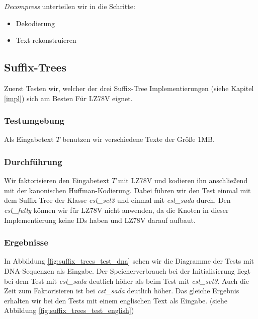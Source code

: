 \documentclass[a4paper,11pt]{scrartcl}%
\theoremstyle{change}
\theoremstyle{nonumberplain}
\theoremstyle{change}
\theoremstyle{nonumberplain}
\theoremstyle{change}
\theoremstyle{nonumberplain}
\begin{document}
\textit{Decompress} unterteilen wir in die Schritte: 

\begin{itemize}
	\item Dekodierung
	\item Text rekonstruieren
\end{itemize}

\subsection{Suffix-Trees}

Zuerst Testen wir, welcher der drei Suffix-Tree Implementierungen (siehe Kapitel \ref{impl}) sich am Besten Für LZ78V eignet.

\subsubsection{Testumgebung}

Als Eingabetext $T$ benutzen wir verschiedene Texte der Größe 1MB. 

\subsubsection{Durchführung}

Wir faktorisieren den Eingabetext $T$ mit LZ78V und kodieren ihn anschließend mit der kanonischen Huffman-Kodierung. Dabei führen wir den Test einmal mit dem Suffix-Tree der Klasse \textit{cst\_sct3} und einmal mit \textit{cst\_sada} durch. Den \textit{cst\_fully} können wir für LZ78V nicht anwenden, da die Knoten in dieser Implementierung keine IDs haben und LZ78V darauf aufbaut.

\subsubsection{Ergebnisse}

In Abbildung \ref{fig:suffix_trees_test_dna} sehen wir die Diagramme der Tests mit DNA-Sequenzen als Eingabe. Der Speicherverbrauch bei der Initialisierung liegt bei dem Test mit \textit{cst\_sada} deutlich höher als beim Test mit \textit{cst\_sct3}. Auch die Zeit zum Faktorisieren ist bei \textit{cst\_sada} deutlich höher.
\newline
Das gleiche Ergebnis erhalten wir bei den Tests mit einem englischen Text als Eingabe. (siehe Abbildung \ref{fig:suffix_trees_test_english})
\end{document}
